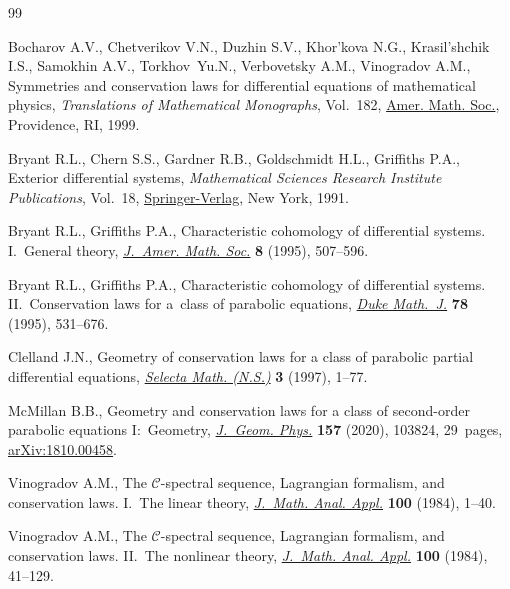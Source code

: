 \documentclass[10pt,a4paper]{amsart}
\numberwithin{equation}{section}
\begin{document}

\begin{thebibliography}{99}
\footnotesize\itemsep=0pt

Bocharov A.V., Chetverikov V.N., Duzhin S.V., Khor'kova N.G., Krasil'shchik
 I.S., Samokhin A.V., Tor\-khov~Yu.N., Verbovetsky A.M., Vinogradov A.M.,
 Symmetries and conservation laws for differential equations of mathematical
 physics, \textit{Translations of Mathematical Monographs}, Vol.~182, \href{https://doi.org/10.1090/mmono/182}{Amer.
 Math. Soc.}, Providence, RI, 1999.

Bryant R.L., Chern S.S., Gardner R.B., Goldschmidt H.L., Griffiths P.A.,
 Exterior differential systems, \textit{Mathematical Sciences Research
 Institute Publications}, Vol.~18, \href{https://doi.org/10.1007/978-1-4613-9714-4}{Springer-Verlag}, New York, 1991.

Bryant R.L., Griffiths P.A., Characteristic cohomology of differential systems.
 {I}.~{G}eneral theory, \href{https://doi.org/10.2307/2152923}{\textit{J.~Amer. Math. Soc.}} \textbf{8} (1995),
 507--596.

Bryant R.L., Griffiths P.A., Characteristic cohomology of differential systems.
 {II}.~{C}onservation laws for a~class of parabolic equations, \href{https://doi.org/10.1215/S0012-7094-95-07824-7}{\textit{Duke
 Math.~J.}} \textbf{78} (1995), 531--676.

Clelland J.N., Geometry of conservation laws for a class of parabolic partial
 differential equations, \href{https://doi.org/10.1007/s000290050005}{\textit{Selecta Math. (N.S.)}} \textbf{3} (1997),
 1--77.

McMillan B.B., Geometry and conservation laws for a class of second-order
 parabolic equations {I}:~{G}eometry, \href{https://doi.org/10.1016/j.geomphys.2020.103824}{\textit{J.~Geom. Phys.}} \textbf{157}
 (2020), 103824, 29~pages, \href{https://arxiv.org/abs/1810.00458}{arXiv:1810.00458}.

Vinogradov A.M., The {${\mathcal C}$}-spectral sequence, {L}agrangian
 formalism, and conservation laws. {I}.~{T}he linear theory, \href{https://doi.org/10.1016/0022-247X(84)90071-4}{\textit{J.~Math.
 Anal. Appl.}} \textbf{100} (1984), 1--40.

Vinogradov A.M., The {${\mathcal C}$}-spectral sequence, {L}agrangian
 formalism, and conservation laws. {II}.~{T}he nonlinear theory,
 \href{https://doi.org/10.1016/0022-247X(84)90072-6}{\textit{J.~Math. Anal. Appl.}} \textbf{100} (1984), 41--129.

\end{thebibliography}
\end{document}
